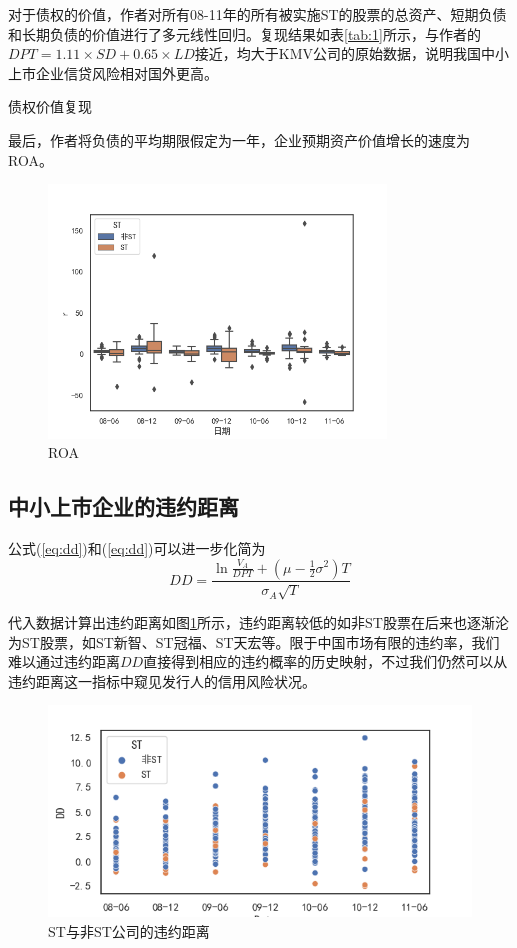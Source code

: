 \documentclass[a4paper,12pt]{ctexart}
\begin{document}
对于债权的价值，作者对所有08-11年的所有被实施ST的股票的总资产、短期负债和长期负债的价值进行了多元线性回归。复现结果如表\ref{tab:1}所示，与作者的$DPT = 1.11\times SD+0.65\times LD$接近，均大于KMV公司的原始数据，说明我国中小上市企业信贷风险相对国外更高。
\begin{table}[H]
    \centering
    \small
    \caption{债权价值复现}\label{tab:1}
\end{table}

最后，作者将负债的平均期限假定为一年，企业预期资产价值增长的速度为ROA。
\begin{figure}[H]
    \centering
    \includegraphics[width=0.8\textwidth]{img/r.png}
    \caption{ROA}
\end{figure}
\subsection*{中小上市企业的违约距离}
公式(\ref{eq:dd})和(\ref{eq:dd})可以进一步化简为
\begin{equation}
    DD=\frac{\ln \frac{V_A}{DPT}+(\mu-\frac{1}{2}\sigma^2)T}{\sigma_A\sqrt{T}}
\end{equation}

代入数据计算出违约距离如图\ref{fig:dd}所示，违约距离较低的如非ST股票在后来也逐渐沦为ST股票，如ST新智、ST冠福、ST天宏等。限于中国市场有限的违约率，我们难以通过违约距离$DD$直接得到相应的违约概率的历史映射，不过我们仍然可以从违约距离这一指标中窥见发行人的信用风险状况。
\begin{figure}[H]
    \includegraphics*[width=\linewidth]{img/dd.png}
    \caption{ST与非ST公司的违约距离}\label{fig:dd}
\end{figure}
\end{document}
